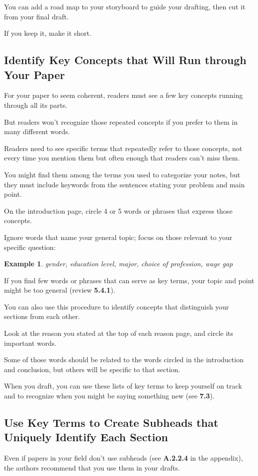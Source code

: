 \documentclass[oneside]{book}
\numberwithin{equation}{section}
\newtheorem{example}{Example}[section]
\begin{document}
You can add a road map to your storyboard to guide your drafting, then cut it from your final draft.

If you keep it, make it short.

\subsection{Identify Key Concepts that Will Run through Your Paper}
For your paper to seem coherent, readers must see a few key concepts running through all its parts.

But readers won't recognize those repeated concepts if you prefer to them in many different words.

Readers need to see specific terms that repeatedly refer to those concepts, not every time you mention them but often enough that readers can't miss them.

You might find them among the terms you used to categorize your notes, but they must include keywords from the sentences stating your problem and main point.

On the introduction page, circle 4 or 5 words or phrases that express those concepts.

Ignore words that name your general topic; focus on those relevant to your specific question:
\begin{example}
    gender, education level, major, choice of profession, wage gap
\end{example}
If you find few words or phrases that can serve as key terms, your topic and point might be too general (review \textbf{5.4.1}).

%
You can also use this procedure to identify concepts that distinguish your sections from each other.

Look at the reason you stated at the top of each reason page, and circle its important words.

Some of those words should be related to the words circled in the introduction and conclusion, but others will be specific to that section.

When you draft, you can use these lists of key terms to keep yourself on track and to recognize when you might be saying something new (see \textbf{7.3}).

\subsection{Use Key Terms to Create Subheads that Uniquely Identify Each Section}
Even if papers in your field don't use subheads (see \textbf{A.2.2.4} in the appendix), the authors recommend that you use them in your drafts.
\end{document}
